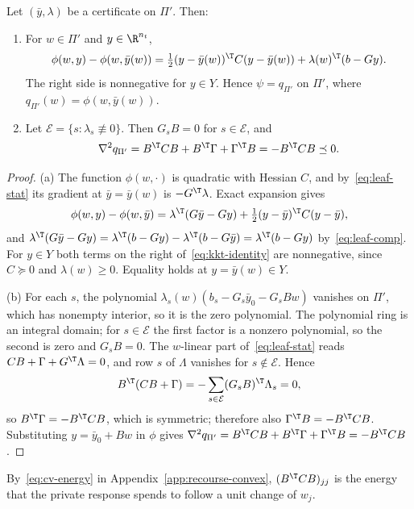 \begin{lemma}\label{lem:leaf}
Let $(\bar y,\lambda)$ be a certificate on $\Pi'$. Then:
\begin{enumerate}
\item[(a)] For $w\in\Pi'$ and $y\in\R^{n_t}$,
\begin{equation}\label{eq:kkt-identity}
\phi(w,y)-\phi(w,\bar y(w))=\tfrac12(y-\bar y(w))^{\T}C(y-\bar y(w))
+\lambda(w)^{\T}(b-Gy).
\end{equation}
The right side is nonnegative for $y\in Y$. Hence $\psi=q_{\Pi'}$ on $\Pi'$,
where $q_{\Pi'}(w)=\phi(w,\bar y(w))$.
\item[(b)] Let $\mathcal E=\{s:\lambda_s\not\equiv0\}$. Then $G_sB=0$ for
$s\in\mathcal E$, and
\[
\nabla^2q_{\Pi'}=B^{\T}CB+B^{\T}\Gamma+\Gamma^{\T}B=-B^{\T}CB\preceq0.
\]
\end{enumerate}
\end{lemma}

\begin{proof}
(a) The function $\phi(w,\cdot)$ is quadratic with Hessian $C$, and
by~\eqref{eq:leaf-stat} its gradient at $\bar y=\bar y(w)$ is
$-G^{\T}\lambda$. Exact expansion gives
\[
\phi(w,y)-\phi(w,\bar y)=\lambda^{\T}(G\bar y-Gy)+\tfrac12(y-\bar y)^{\T}C(y-\bar y),
\]
and $\lambda^{\T}(G\bar y-Gy)=\lambda^{\T}(b-Gy)-\lambda^{\T}(b-G\bar y)
=\lambda^{\T}(b-Gy)$ by~\eqref{eq:leaf-comp}. For $y\in Y$ both terms on the
right of~\eqref{eq:kkt-identity} are nonnegative, since $C\succeq0$ and
$\lambda(w)\ge0$. Equality holds at $y=\bar y(w)\in Y$.

(b) For each $s$, the polynomial $\lambda_s(w)(b_s-G_s\bar y_0-G_sBw)$
vanishes on $\Pi'$, which has nonempty interior, so it is the zero
polynomial. The polynomial ring is an integral domain; for $s\in\mathcal E$
the first factor is a nonzero polynomial, so the second is zero and
$G_sB=0$. The $w$-linear part of~\eqref{eq:leaf-stat} reads
$CB+\Gamma+G^{\T}\Lambda=0$, and row $s$ of $\Lambda$ vanishes for
$s\notin\mathcal E$. Hence
\[
B^{\T}(CB+\Gamma)=-\sum_{s\in\mathcal E}(G_sB)^{\T}\Lambda_s=0,
\]
so $B^{\T}\Gamma=-B^{\T}CB$, which is symmetric; therefore also
$\Gamma^{\T}B=-B^{\T}CB$. Substituting $y=\bar y_0+Bw$ in $\phi$ gives
$\nabla^2q_{\Pi'}=B^{\T}CB+B^{\T}\Gamma+\Gamma^{\T}B=-B^{\T}CB$.
\end{proof}

By~\eqref{eq:cv-energy} in Appendix~\ref{app:recourse-convex},
$(B^{\T}CB)_{jj}$ is the energy that the private response spends to follow a
unit change of $w_j$.

